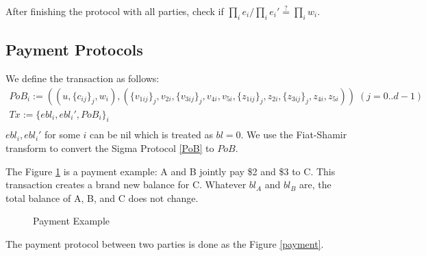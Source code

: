 \documentclass[10pt,fleqn]{article}
\begin{document}
After finishing the protocol with all parties, check if $\prod_i e_i / \prod_i e_i' \overset{?}{=} \prod_i w_i$.

\subsection{Payment Protocols}
We define the transaction as follows:
\begin{multline*}
PoB_i := ((u, \{c_{ij}\}_j, w_i), (\{v_{1ij}\}_j, v_{2i}, \{v_{3ij}\}_j, v_{4i}, v_{5i}, \{z_{1ij}\}_j, z_{2i}, \{z_{3ij}\}_j, z_{4i}, z_{5i})) \; (j = 0..d-1) \\
Tx := \{ebl_i, ebl_i', PoB_i \}_i \\
\end{multline*}
$ebl_i, ebl_i'$ for some $i$ can be \textsf{nil} which is treated as $bl=0$. We use the Fiat-Shamir transform to convert the Sigma Protocol \ref{PoB} to $PoB$.

The Figure \ref{payment_example} is a payment example: A and B jointly pay \$2 and \$3 to C. This transaction creates a brand new balance for C. Whatever $bl_A$ and $bl_B$ are, the total balance of A, B, and C does not change.
\begin{figure}[H]
\begin{center}
\end{center}
\label{payment_example}
\caption{Payment Example}
\end{figure}

The payment protocol between two parties is done as the Figure \ref{payment}.
\end{document}
